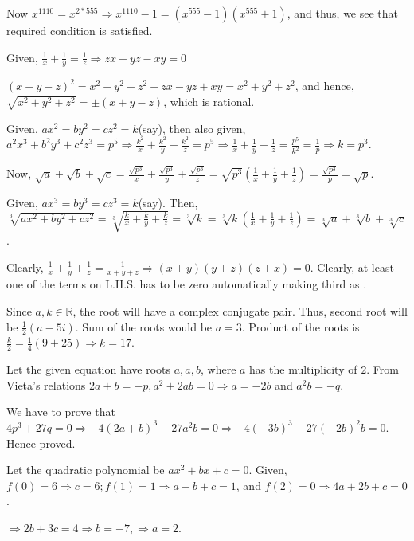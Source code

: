   Now $x^{1110} = x^{2*555}\Rightarrow x^{1110} - 1 = (x^{555} - 1)(x^{555} + 1)$, and thus, we see that
  required condition is satisfied.
\item Given, $\frac{1}{x} + \frac{1}{y} = \frac{1}{z} \Rightarrow zx + yz - xy = 0$

  $(x + y - z)^2 = x^2 + y^2 + z^2 - zx - yz + xy = x^2 + y^2 + z^2$, and hence, $\sqrt{x^2 + y^2 + z^2} =
  \pm(x + y - z)$, which is rational.
\item Given, $ax^2 = by^2 = cz^2 = k$(say), then also given, $a^2x^3 + b^2y^3 + c^2z^3 = p^5 \Rightarrow
  \frac{k^2}{x} + \frac{k^2}{y} + \frac{k^2}{z} = p^5 \Rightarrow \frac{1}{x} + \frac{1}{y} + \frac{1}{z} =
  \frac{p^5}{k^2} = \frac{1}{p} \Rightarrow k = p^3$.

  Now, $\sqrt{a} + \sqrt{b} + \sqrt{c} = \frac{\sqrt{p^3}}{x} + \frac{\sqrt{p^3}}{y} + \frac{\sqrt{p^3}}{z}
  = \sqrt{p^3}\left(\frac{1}{x} + \frac{1}{y} + \frac{1}{z}\right) = \frac{\sqrt{p^3}}{p} = \sqrt{p}$.
\item Given, $ax^3 = by^3 = cz^3 = k$(say). Then, $\sqrt[3]{ax^2 + by^2 + cz^2} = \sqrt[3]{\frac{k}{x} +
  \frac{k}{y} + \frac{k}{z}} = \sqrt[3]{k} = \sqrt[3]{k}\left(\frac{1}{x} + \frac{1}{y} + \frac{1}{z}\right)
  = \sqrt[3]{a} + \sqrt[3]{b} + \sqrt[3]{c}$.
\item Clearly, $\frac{1}{x} + \frac{1}{y} + \frac{1}{z} = \frac{1}{x + y + z} \Rightarrow (x + y)(y + z)(z +
  x) = 0$. Clearly, at least one of the terms on L.H.S. has to be zero automatically making third as
  .
\item Since $a, k\in\mathbb{R}$, the root will have a complex conjugate pair. Thus, second root will be
  $\frac{1}{2}(a - 5i)$. Sum of the roots would be $a = 3$. Product of the roots is $\frac{k}{2} =
  \frac{1}{4}(9 + 25) \Rightarrow k = 17$.
\item Let the given equation have roots $a, a, b$, where $a$ has the multiplicity of $2$. From Vieta's
  relations $2a + b = -p, a^2 + 2ab = 0 \Rightarrow a = -2b$ and $a^2b = -q$.

  We have to prove that $4p^3 + 27q = 0 \Rightarrow -4(2a + b)^3 -27a^2b = 0 \Rightarrow -4(-3b)^3 -
  27(-2b)^2b = 0$. Hence proved.
\item Let the quadratic polynomial be $ax^2 + bx + c = 0$. Given, $f(0) = 6 \Rightarrow c = 6; f(1) = 1
  \Rightarrow a + b + c = 1$, and $f(2) = 0 \Rightarrow 4a + 2b + c = 0$.

  $\Rightarrow 2b + 3c = 4 \Rightarrow b = -7, \Rightarrow a = 2$.

